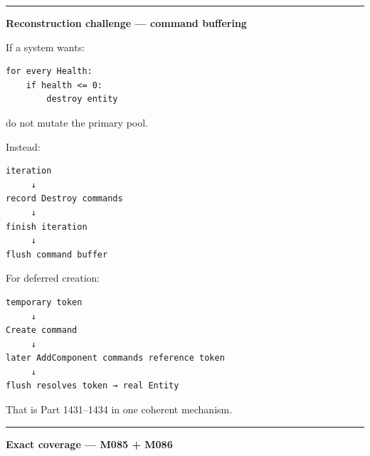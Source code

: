 \begin{center}\rule{0.5\linewidth}{0.5pt}\end{center}

\textbf{Reconstruction challenge --- command buffering}

If a system wants:

\begin{verbatim}
for every Health:
    if health <= 0:
        destroy entity
\end{verbatim}

do not mutate the primary pool.

Instead:

\begin{verbatim}
iteration
     ↓
record Destroy commands
     ↓
finish iteration
     ↓
flush command buffer
\end{verbatim}

For deferred creation:

\begin{verbatim}
temporary token
     ↓
Create command
     ↓
later AddComponent commands reference token
     ↓
flush resolves token → real Entity
\end{verbatim}

That is Part 1431--1434 in one coherent mechanism.

\begin{center}\rule{0.5\linewidth}{0.5pt}\end{center}

\textbf{Exact coverage --- M085 + M086}

